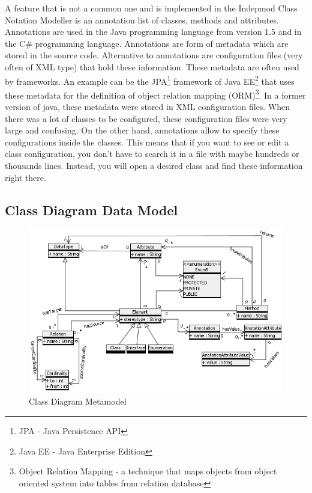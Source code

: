 A feature that is not a common one and is implemented in the Indepmod Class Notation Modeller is an annotation list of classes, methods and attributes. Annotations are used in the Java programming language from version 1.5 and in the C\# programming language. Annotations are form of metadata which are stored in the source code. Alternative to annotations are configuration files (very often of XML type) that hold these information. These metadata are often used by frameworks. An example can be the JPA\footnote{JPA - Java Persistence API} framework of Java EE\footnote{Java EE - Java Enterprise Edition} that uses these metadata for the definition of object relation mapping (ORM)\footnote{Object Relation Mapping - a technique that maps objects from object oriented system into tables from relation database}. In a former version of java, these metadata were stored in XML configuration files. When there was a lot of classes to be configured, these configuration files were very large and confusing. On the other hand, annotations allow to specify these configurations inside the classes. This means that if you want to see or edit a class configuration, you don't have to search it in a file with maybe hundreds or thousands lines. Instead, you will open a desired class and find these information right there.

\subsection{Class Diagram Data Model}

\begin{figure}[!ht]
\begin{center}
\includegraphics[scale=1]{img/classDiagramMetamodel.png}
\caption{Class Diagram Metamodel}
\label{f-classDiagramMetamodel}
\end{center}
\end{figure}

